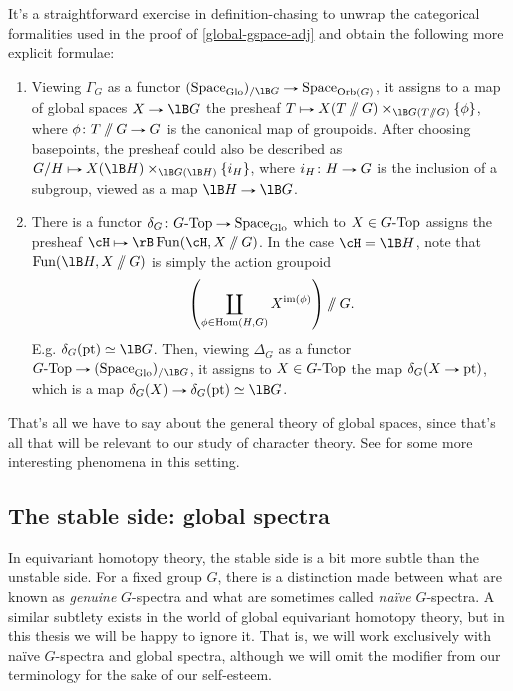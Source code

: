 \begin{remark}
  \label{global-gspace-adj-unwrap}
  It's a straightforward exercise in definition-chasing to unwrap the
  categorical formalities used in the proof of
  \cref{global-gspace-adj} and obtain the following more explicit
  formulae:
  \begin{enumerate}
  \item \label{global-gspace-adj-unwrap-right} Viewing $\Gamma_G$ as a
    functor $(\Space_\Glo)_{/\lB G} \to \Space_{\Orb(G)}$, it assigns
    to a map of global spaces $X \to \lB G$ the presheaf
    $T \mapsto X(T \sslash G) \times_{\lB G(T \sslash G)} \{\phi\}$,
    where $\phi \c T \sslash G \to G$ is the canonical map of
    groupoids. After choosing basepoints, the presheaf could also be
    described as $G/H \mapsto X(\lB H) \times_{\lB G(\lB H)} \{i_H\}$,
    where $i_H \c H \to G$ is the inclusion of a subgroup, viewed as a
    map $\lB H \to \lB G$.
  \item \label{global-gspace-adj-unwrap-left} There is a functor
    $\delta_G \c G\dash\Top \to \Space_\Glo$ which to
    $X \in G\text{-}\mathrm{Top}$ assigns the presheaf
    $\cH \mapsto \rB \Fun(\cH, X \sslash G)$. In the case
    $\cH = \lB H$, note that $\Fun(\lB H, X \sslash G)$ is simply the
    action groupoid
    \[
    \left( \coprod_{\phi \in \operatorname{Hom}(H,G)} X^{\operatorname{im}(\phi)} \right) \sslash G.
    \]
    E.g. $\delta_G(\pt) \iso \lB G$. Then, viewing $\Delta_G$ as a
    functor $G\dash\Top \to (\Space_\Glo)_{/\lB G}$, it assigns to
    $X \in G\text{-}\mathrm{Top}$ the map $\delta_G(X \to \pt)$, which is a map
    $\delta_G(X) \to \delta_G(\pt) \iso \lB G$.
  \end{enumerate}
\end{remark}

That's all we have to say about the general theory of global spaces,
since that's all that will be relevant to our study of character
theory. See \cite{rezk-global-cohesion} for some more interesting
phenomena in this setting.


\subsection{The stable side: global spectra}
\label{global-stable}

In equivariant homotopy theory, the stable side is a bit more subtle
than the unstable side. For a fixed group $G$, there is a distinction
made between what are known as \emph{genuine} $G$-spectra and what are
sometimes called \emph{na\"ive} $G$-spectra. A similar subtlety exists
in the world of global equivariant homotopy theory, but in this thesis
we will be happy to ignore it. That is, we will work exclusively with
na\"ive $G$-spectra and global spectra, although we will omit the
modifier from our terminology for the sake of our self-esteem.


